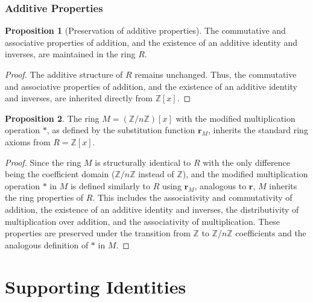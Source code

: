 \documentclass{article}
\theoremstyle{plain}
\theoremstyle{definition}
\newtheorem{proposition}{Proposition}
\newcommand{\redu}{\textbf{r}}
\newcommand{\Z}{\mathbb{Z}}
\newcommand{\Rx}{R}
\newcommand{\Mx}{M}
\begin{document}
\subsubsection{Additive Properties}
\begin{proposition}[Preservation of additive properties] \label{proposition:ring:3}
The commutative and associative properties of addition, and the existence of an additive identity and inverses, are maintained in the ring \(R\). 
\end{proposition}
\begin{proof}
The additive structure of \(R\) remains unchanged. Thus, the commutative and associative properties of addition, and the existence of an additive identity and inverses, are inherited directly from \( \Z[x] \).
\end{proof}

\begin{proposition} \label{proposition:modularring:1}
The ring \( \Mx = (\Z/n\Z)[x] \) with the modified multiplication operation \(\ast\), as defined by the substitution function \(\redu_M\), inherits the standard ring axioms from \( R = \Z[x] \).
\end{proposition}
\begin{proof}
Since the ring \( \Mx \) is structurally identical to \( \Rx \) with the only difference being the coefficient domain (\(\Z/n\Z\) instead of \(\Z\)), and the modified multiplication operation \(\ast\) in \( \Mx \) is defined similarly to \( \Rx \) using \(\redu_M\), analogous to \(\redu\), \( \Mx \) inherits the ring properties of \( \Rx \). This includes the associativity and commutativity of addition, the existence of an additive identity and inverses, the distributivity of multiplication over addition, and the associativity of multiplication. These properties are preserved under the transition from \(\Z\) to \(\Z/n\Z\) coefficients and the analogous definition of \(\ast\) in \( \Mx \).
\end{proof}

\section{Supporting Identities}
\end{document}
